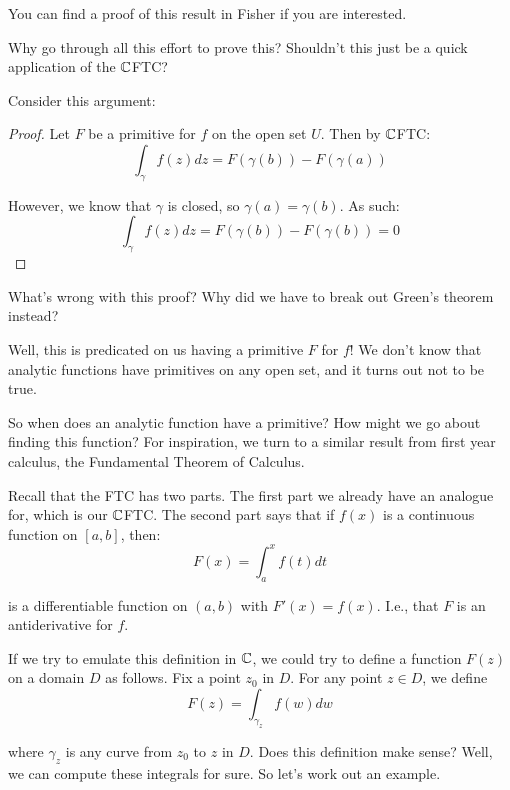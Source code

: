 You can find a proof of this result in Fisher if you are interested.

Why go through all this effort to prove this? Shouldn't this just be a quick application of the $\mathbb{C}$FTC?

\begin{ex}{}{} Consider this argument:

\begin{proof}Let $F$ be a primitive for $f$ on the open set $U$. Then by $\mathbb{C}$FTC:
$$\int_{\gamma} f(z)dz = F(\gamma(b)) - F(\gamma(a))$$

However, we know that $\gamma$ is closed, so $\gamma(a) = \gamma(b)$. As such:
$$\int_{\gamma} f(z)dz = F(\gamma(b)) - F(\gamma(b)) = 0$$\end{proof}

What's wrong with this proof? Why did we have to break out Green's theorem instead?

Well, this is predicated on us having a primitive $F$ for $f$! We don't know that analytic functions have primitives on any open set, and it turns out not to be true.
\end{ex}

So when does an analytic function have a primitive? How might we go about finding this function? For inspiration, we turn to a similar result from first year calculus, the Fundamental Theorem of Calculus.

Recall that the FTC has two parts. The first part we already have an analogue for, which is our $\mathbb{C}$FTC. The second part says that if $f(x)$ is a continuous function on $[a,b]$, then:
$$F(x) = \int_a^xf(t)dt$$

\noin is a differentiable function on $(a,b)$ with $F'(x) = f(x)$. I.e., that $F$ is an antiderivative for $f$.

If we try to emulate this definition in $\mathbb{C}$, we could try to define a function $F(z)$ on a domain $D$ as follows. Fix a point $z_0$ in $D$. For any point $z\in D$, we define
$$F(z) = \int_{\gamma_z}f(w)dw$$

\noin where $\gamma_z$ is any curve from $z_0$ to $z$ in $D$. Does this definition make sense? Well, we can compute these integrals for sure. So let's work out an example.

